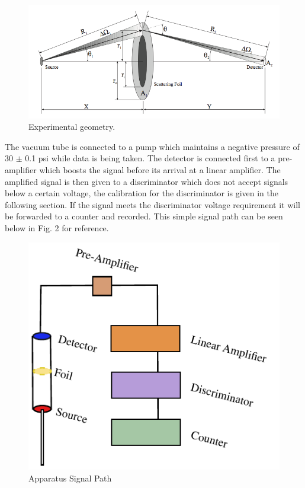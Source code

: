 \begin{figure}[H]
\begin{center}
\includegraphics[width=7in]{apparatus.png}
\caption{Experimental geometry.}
\end{center}
\end{figure}

\indent \indent The vacuum tube is connected to a pump which maintains a negative pressure of 30 $\pm$ 0.1 psi while data is being taken.  The detector is connected first to a pre-amplifier which boosts the signal before its arrival at a linear amplifier.  The amplified signal is then given to a discriminator which does not accept signals below a certain voltage, the calibration for the discriminator is given in the following section.  If the signal meets the discriminator voltage requirement it will be forwarded to a counter and recorded. This simple signal path can be seen below in Fig. 2 for reference.    


\begin{figure}[H]
\begin{center}
\includegraphics[width=4.5in, angle=90]{Figure1Ap.pdf}
\caption{Apparatus Signal Path}
\end{center}
\end{figure}

